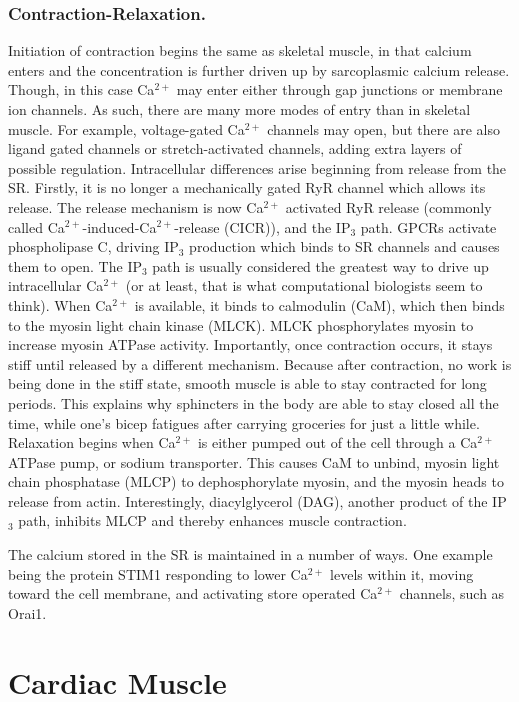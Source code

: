 \subsubsection{Contraction-Relaxation.} 
Initiation of contraction begins the same as skeletal muscle, in that calcium enters and the concentration is further driven up by sarcoplasmic calcium release. Though, in this case Ca$^{2+}$ may enter either through gap junctions or membrane ion channels. As such, there are many more modes of entry than in skeletal muscle. For example, voltage-gated Ca$^{2+}$ channels may open, but there are also ligand gated channels or stretch-activated channels, adding extra layers of possible regulation. Intracellular differences arise beginning from release from the SR. Firstly, it is no longer a mechanically gated RyR channel which allows its release. The release mechanism is now Ca$^{2+}$ activated RyR release (commonly called Ca$^{2+}$-induced-Ca$^{2+}$-release (CICR)), and the IP$_3$ path. GPCRs activate phospholipase C, driving IP$_3$ production which binds to SR channels and causes them to open. The IP$_3$ path is usually considered the greatest way to drive up intracellular Ca$^{2+}$ (or at least, that is what computational biologists seem to think). When Ca$^{2+}$ is available, it binds to calmodulin (CaM), which then binds to the myosin light chain kinase (MLCK). MLCK phosphorylates myosin to increase myosin ATPase activity. Importantly, once contraction occurs, it stays stiff until released by a different mechanism. Because after contraction, no work is being done in the stiff state, smooth muscle is able to stay contracted for long periods. This explains why sphincters in the body are able to stay closed all the time, while one's bicep fatigues after carrying groceries for just a little while. Relaxation begins when Ca$^{2+}$ is either pumped out of the cell through a Ca$^{2+}$ATPase pump, or sodium transporter. This causes CaM to unbind, myosin light chain phosphatase (MLCP) to dephosphorylate myosin, and the myosin heads to release from actin. Interestingly, diacylglycerol (DAG), another product of the IP$_3$ path, inhibits MLCP and thereby enhances muscle contraction.\newline

The calcium stored in the SR is maintained in a number of ways. One example being the protein STIM1 responding to lower Ca$^{2+}$ levels within it, moving toward the cell membrane, and activating store operated Ca$^{2+}$ channels, such as Orai1. 

\section{Cardiac Muscle}

